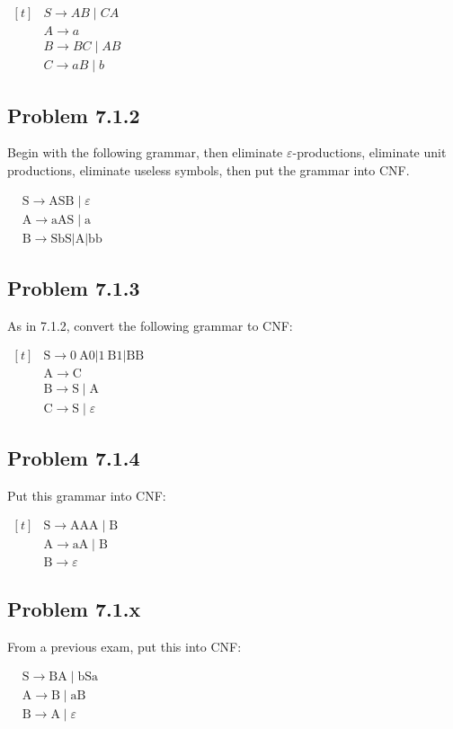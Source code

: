 \documentclass[12pt]{scrbook}
\begin{document}
$ \begin{aligned}[t]
& S \rightarrow A B \mid C A \\
& A \rightarrow a \\
& B \rightarrow B C \mid A B \\
& C \rightarrow a B \mid b
\end{aligned} $

\newpage \subsection*{Problem 7.1.2}Begin with the following grammar, then
eliminate $\varepsilon$-productions, eliminate unit productions, eliminate
useless symbols, then put the grammar into CNF.

$ \begin{aligned}
& \mathrm{S} \rightarrow \mathrm{ASB} \mid \varepsilon \\
& \mathrm{A} \rightarrow \mathrm{aAS} \mid \mathrm{a} \\
& \mathrm{B} \rightarrow \mathrm{SbS}|\mathrm{A}| \mathrm{bb}
\end{aligned} $

\subsection*{Problem 7.1.3}As in 7.1.2, convert the following grammar to CNF:

$ \begin{aligned}[t]
& \mathrm{S} \rightarrow 0 \mathrm{~A} 0|1 \mathrm{~B} 1| \mathrm{BB} \\
& \mathrm{A} \rightarrow \mathrm{C} \\
& \mathrm{B} \rightarrow \mathrm{S} \mid \mathrm{A} \\
& \mathrm{C} \rightarrow \mathrm{S} \mid \varepsilon
\end{aligned} $

\subsection*{Problem 7.1.4}Put this grammar into CNF:

$\begin{aligned}[t]
& \mathrm{S} \rightarrow \mathrm{AAA} \mid \mathrm{B} \\
& \mathrm{A} \rightarrow \mathrm{aA} \mid \mathrm{B} \\
& \mathrm{B} \rightarrow \varepsilon
\end{aligned}$

\subsection*{Problem 7.1.x}From a previous exam, put this into CNF:

$\begin{aligned}
& \mathrm{S} \rightarrow \mathrm{BA} \mid \mathrm{bSa} \\
& \mathrm{A} \rightarrow \mathrm{B} \mid \mathrm{aB} \\
& \mathrm{B} \rightarrow \mathrm{A} \mid \varepsilon
\end{aligned}$
\end{document}
